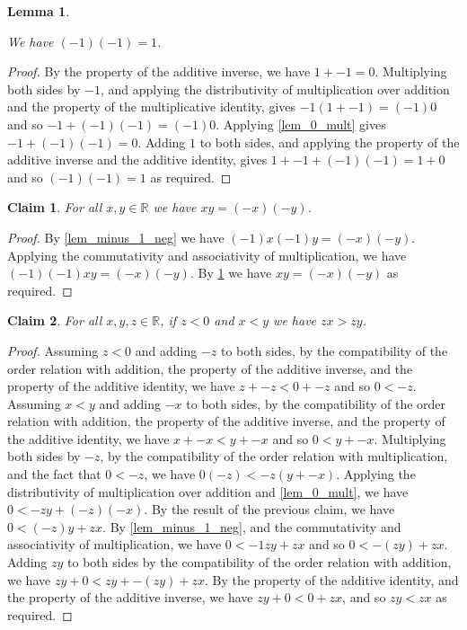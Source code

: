 \documentclass{article}
\theoremstyle{plain}
\newtheorem{lem}[thm]{Lemma}
\newtheorem*{claim}{Claim}
\begin{document}
\begin{lem}
    \label{lem_sq_min_one}
    
    We have $(-1)(-1) = 1$.
\end{lem}

\begin{proof}
    By the property of the additive inverse, we have $1 + -1 = 0$. Multiplying both sides by $-1$, and applying the distributivity of multiplication over addition and the property of the multiplicative identity, gives $-1(1 + -1) = (-1)0$ and so $-1 + (-1)(-1) = (-1)0$. Applying \ref{lem_0_mult} gives $-1 + (-1)(-1) = 0$. Adding $1$ to both sides, and applying the property of the additive inverse and the additive identity, gives $1 + -1 + (-1)(-1) = 1 + 0$ and so $(-1)(-1) = 1$ as required.
\end{proof}

\begin{claim}
    For all $x,y \in \mathbb{R}$ we have $xy = (-x)(-y)$.
\end{claim}

\begin{proof}
    By \ref{lem_minus_1_neg} we have $(-1)x(-1)y = (-x)(-y)$. Applying the commutativity and associativity of multiplication, we have $(-1)(-1)xy = (-x)(-y)$. By \ref{lem_sq_min_one} we have $xy = (-x)(-y)$ as required.
\end{proof}

\begin{claim}
    For all $x,y,z \in \mathbb{R}$, if $z < 0$ and $x < y$ we have $zx > zy$.
\end{claim}

\begin{proof}
    Assuming $z < 0$ and adding $-z$ to both sides, by the compatibility of the order relation with addition, the property of the additive inverse, and the property of the additive identity, we have $z + -z < 0 + -z$ and so $0 < -z$. \\
    Assuming $x < y$ and adding $-x$ to both sides, by the compatibility of the order relation with addition, the property of the additive inverse, and the property of the additive identity, we have $x + -x < y + -x$ and so $0 < y + -x$. Multiplying both sides by $-z$, by the compatibility of the order relation with multiplication, and the fact that $0 < -z$, we have $0(-z) < -z(y + -x)$. Applying the distributivity of multiplication over addition and \ref{lem_0_mult}, we have $0 < -zy + (-z)(-x)$. By the result of the previous claim, we have $0 < (-z)y + zx$. By \ref{lem_minus_1_neg}, and the commutativity and associativity of multiplication, we have $0 < -1zy + zx$ and so $0 < -(zy) + zx$. Adding $zy$ to both sides by the compatibility of the order relation with addition, we have $zy + 0 < zy + -(zy) + zx$. By the property of the additive identity, and the property of the additive inverse, we have $zy + 0 < 0 + zx$, and so $zy < zx$ as required.
\end{proof}
\end{document}
